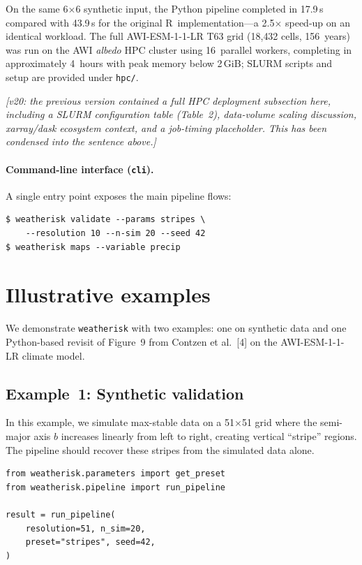 \documentclass[preprint,12pt,a4paper]{elsarticle}
\newcommand{\rev}[1]{{#1}}
\newcommand{\revb}[1]{{#1}}
\newcommand{\revn}[1]{{\color{RevisionViolet}#1}}
\begin{document}
On the same 6$\times$6 synthetic input, the Python pipeline
completed in 17.9\,s compared with 43.9\,s for the original
R~implementation---a 2.5$\times$ speed-up on an identical workload.
The full AWI-ESM-1-1-LR T63 grid (18{,}432 cells, 156~years) was
run on the AWI \emph{albedo} HPC cluster using 16~parallel workers,
completing in approximately 4~hours with peak memory below 2\,GiB;
SLURM scripts and setup are provided under \texttt{hpc/}.

\revn{\textit{[v20: the previous version contained a full HPC deployment subsection here, including a SLURM configuration table (Table~2), data-volume scaling discussion, xarray/dask ecosystem context, and a job-timing placeholder.  This has been condensed into the sentence above.]}}

\paragraph{Command-line interface (\texttt{cli}).}
A single entry point exposes the main pipeline flows:
\begin{lstlisting}[numbers=none]
$ weatherisk validate --params stripes \
    --resolution 10 --n-sim 20 --seed 42
$ weatherisk maps --variable precip
\end{lstlisting}

\section{Illustrative examples}
\label{sec:examples}

We demonstrate \texttt{weatherisk} with \rev{two} examples: one on
synthetic data \rev{and one \revb{Python-based revisit of Figure~9 from Contzen}
et al.~[4] on the AWI-ESM-1-1-LR climate model}.

\subsection{Example~1: Synthetic validation}
\label{sec:ex-synthetic}

In this example, we simulate max-stable data on a 51$\times$51 grid
where the semi-major axis $b$ increases linearly from left to right,
creating vertical ``stripe'' regions.  The pipeline should recover
these stripes from the simulated data alone.

\begin{lstlisting}[caption={Running the stripes validation.},
  label=lst:validate]
from weatherisk.parameters import get_preset
from weatherisk.pipeline import run_pipeline

result = run_pipeline(
    resolution=51, n_sim=20,
    preset="stripes", seed=42,
)
\end{lstlisting}
\end{document}

